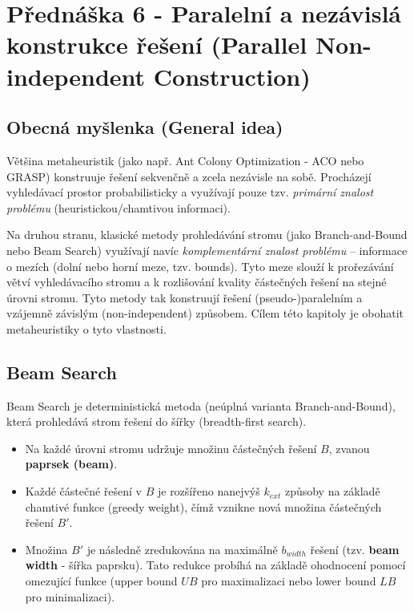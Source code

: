 \documentclass[12pt,a4paper]{article}
\theoremstyle{definition}
\begin{document}
\section{Přednáška 6 - Paralelní a nezávislá konstrukce řešení (Parallel Non-independent Construction)}

\subsection{Obecná myšlenka (General idea)}
Většina metaheuristik (jako např. Ant Colony Optimization - ACO nebo GRASP) konstruuje řešení sekvenčně a zcela nezávisle na sobě. Procházejí vyhledávací prostor probabilisticky a využívají pouze tzv. \textit{primární znalost problému} (heuristickou/chamtivou informaci). 

Na druhou stranu, klasické metody prohledávání stromu (jako Branch-and-Bound nebo Beam Search) využívají navíc \textit{komplementární znalost problému} – informace o mezích (dolní nebo horní meze, tzv. bounds). Tyto meze slouží k prořezávání větví vyhledávacího stromu a k rozlišování kvality částečných řešení na stejné úrovni stromu. Tyto metody tak konstruují řešení (pseudo-)paralelním a vzájemně závislým (non-independent) způsobem. Cílem této kapitoly je obohatit metaheuristiky o tyto vlastnosti.

\subsection{Beam Search}
Beam Search je deterministická metoda (neúplná varianta Branch-and-Bound), která prohledává strom řešení do šířky (breadth-first search). 
\begin{itemize}
    \item Na každé úrovni stromu udržuje množinu částečných řešení $B$, zvanou \textbf{paprsek (beam)}.
    \item Každé částečné řešení v $B$ je rozšířeno nanejvýš $k_{ext}$ způsoby na základě chamtivé funkce (greedy weight), čímž vznikne nová množina částečných řešení $B'$.
    \item Množina $B'$ je následně zredukována na maximálně $b_{width}$ řešení (tzv. \textbf{beam width} - šířka paprsku). Tato redukce probíhá na základě ohodnocení pomocí omezující funkce (upper bound $UB$ pro maximalizaci nebo lower bound $LB$ pro minimalizaci).
\end{itemize}
\end{document}
